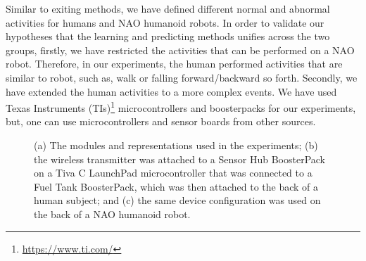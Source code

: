 \documentclass[letterpaper]{article}
\begin{document}
\begin{sloppy}
Similar to exiting methods, we have defined different normal and abnormal activities for humans and 
NAO humanoid robots. In order to validate our hypotheses that the learning and predicting methods 
unifies across the two groups, firstly, we have restricted the activities that can be performed 
on a NAO robot. Therefore, in our experiments, the human performed activities that are similar to 
robot, such as, walk or falling forward/backward so forth. Secondly, we have extended the human 
activities to a more complex events.  We have used Texas Instruments 
(TIs)\footnote{\url{https://www.ti.com/}}  microcontrollers and boosterpacks for our experiments, 
but, one can use microcontrollers and 
 sensor boards from other sources.  



\begin{figure}[!t]
\centering
{}
\caption{(a) The modules and representations used in the experiments;  (b) the wireless transmitter 
was attached to a Sensor Hub BoosterPack on a Tiva C LaunchPad microcontroller that was connected 
to a Fuel Tank BoosterPack, which was then attached to the back of a human subject; and (c) the 
same device configuration was used on the back of a NAO humanoid robot.}
 \label{fig:framework}
\end{figure}


\end{sloppy}
\end{document}
